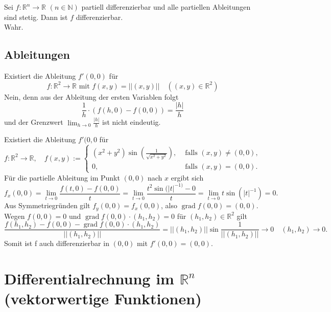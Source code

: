 \documentclass[parskip=full]{scrartcl}
\DeclareMathOperator{\grad}{grad}
\begin{document}
Sei $f : \mathbb{R}^n \to \mathbb{R}$ $(n \in \mathbb{N})$ partiell differenzierbar und alle partiellen Ableitungen sind stetig.
Dann ist $f$ differenzierbar.\\
Wahr.

\subsection{Ableitungen}
Existiert die Ableitung $f'(0,0)$ für
\begin{displaymath}
  f : \mathbb{R}^2 \to \mathbb{R} \text{ mit } f(x,y) = ||(x,y)|| \quad ((x,y) \in \mathbb{R}^2)
\end{displaymath}
Nein, denn aus der Ableitung der ersten Variablen folgt
\begin{displaymath}
  \frac{1}{h} \cdot (f(h, 0) - f(0,0)) = \frac{|h|}{h}
\end{displaymath}
und der Grenzwert $\lim_{h \to 0} \frac{|h|}{h}$ ist nicht eindeutig.

Existiert die Ableitung $f'(0,0$ für
\begin{displaymath}
  f : \mathbb{R}^2 \to \mathbb{R}, \quad f(x,y) :=
  \begin{cases}
    (x^2 + y^2) \sin\left(\frac{1}{\sqrt{x^2 + y^2}}\right),& \text{ falls } (x,y) \neq (0,0),\\
    0,& \text{ falls } (x,y) = (0,0).
  \end{cases}
\end{displaymath}
Für die partielle Ableitung im Punkt $(0,0)$ nach $x$ ergibt sich
\begin{displaymath}
  f_x(0,0) = \lim_{t \to 0} \frac{f(t,0) - f(0,0)}{t} = \lim_{t \to 0} \frac{t^2 \sin(|t|^{-1)} - 0}{t} = \lim_{t \to 0} t \sin(|t|^{-1}) = 0.
\end{displaymath}
Aus Symmetriegründen gilt $f_y(0,0) = f_x(0,0)$, also $\grad f(0,0) = (0,0)$.
Wegen $f(0,0) = 0$ und $\grad f(0,0) \cdot (h_1, h_2) = 0$ für $(h_1, h_2) \in \mathbb{R}^2$ gilt
\begin{displaymath}
  \frac{f(h_1, h_2) - f(0,0) - \grad f(0,0) \cdot (h_1, h_2)}{||(h_1, h_2)||} = ||(h_1, h_2)|| \sin \frac{1}{||(h_1, h_2)||} \to 0 \quad (h_1, h_2) \to 0.
\end{displaymath}
Somit ist f auch differenzierbar in $(0,0)$ mit $f'(0,0) = (0,0)$.

\section{Differentialrechnung im $\mathbb{R}^n$ (vektorwertige Funktionen)}
\end{document}
